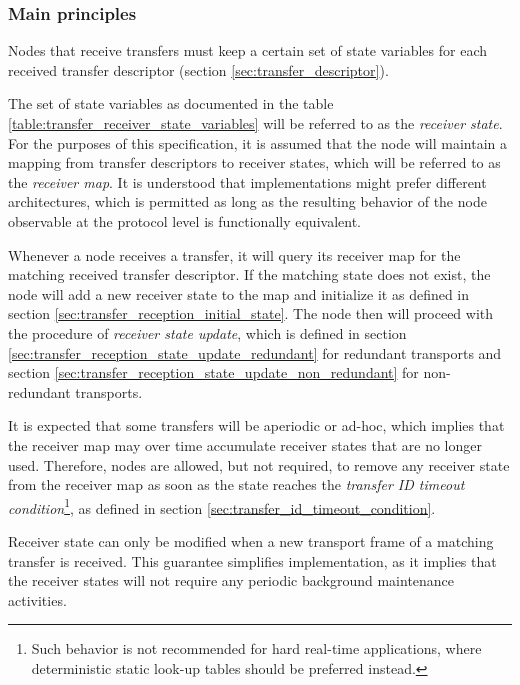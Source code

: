 \subsubsection{Main principles}

Nodes that receive transfers must keep a certain set of state variables for each
received transfer descriptor (section \ref{sec:transfer_descriptor}).

The set of state variables as documented in the table \ref{table:transfer_receiver_state_variables}
will be referred to as the \emph{receiver state}.
For the purposes of this specification, it is assumed that the node will maintain a
mapping from transfer descriptors to receiver states, which will be referred to as the \emph{receiver map}.
It is understood that implementations might prefer different architectures, which is permitted as
long as the resulting behavior of the node observable at the protocol level is functionally equivalent.

Whenever a node receives a transfer, it will query its receiver map for the matching received transfer descriptor.
If the matching state does not exist, the node will add a new receiver state to the map
and initialize it as defined in section \ref{sec:transfer_reception_initial_state}.
The node then will proceed with the procedure of \emph{receiver state update},
which is defined in section \ref{sec:transfer_reception_state_update_redundant} for redundant transports
and section \ref{sec:transfer_reception_state_update_non_redundant} for non-redundant transports.

It is expected that some transfers will be aperiodic or ad-hoc,
which implies that the receiver map may over time accumulate receiver states that are no longer used.
Therefore, nodes are allowed, but not required, to remove any receiver state from the receiver map
as soon as the state reaches the \emph{transfer ID timeout condition}\footnote{Such behavior is
not recommended for hard real-time applications, where deterministic static look-up tables
should be preferred instead.},
as defined in section \ref{sec:transfer_id_timeout_condition}.

Receiver state can only be modified when a new transport frame of a matching transfer is received.
This guarantee simplifies implementation, as it implies that the receiver states will not
require any periodic background maintenance activities.

